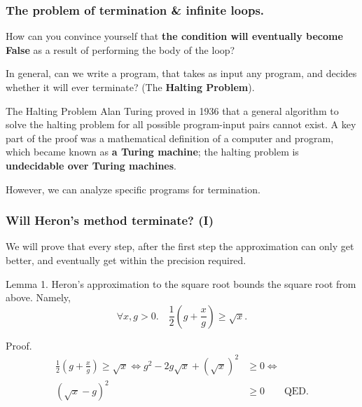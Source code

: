 \documentclass{beamer} %
\newcommand\emc[1]{\textcolor{brightblue}{\textbf{#1}}}
\begin{document}
\begin{frame}
\frametitle{The problem of termination \& infinite loops.}

How can you convince yourself that \emc{the condition will eventually become False} as a result of performing the body of the loop?

\vspace{5mm}
In general, can we write a program, that takes as input any program, and decides whether it will ever terminate? (The \emc{Halting Problem}).

\begin{block}{The Halting Problem}
Alan Turing proved in 1936 that a general algorithm to solve the halting problem for all possible program-input pairs cannot exist. A key part of the proof was a mathematical definition of a computer and program, which became known as \emc{a Turing machine}; the halting problem is \emc{undecidable over Turing machines}. %
\end{block}

However, we can analyze specific programs for termination.

\end{frame}

\begin{frame}
\frametitle{Will Heron's method terminate? (I)}

We will prove that every step, after the first step the approximation can only get better, and eventually get within the precision required.

\vspace{3mm}
Lemma 1. Heron's approximation to the square root bounds the square root from above. Namely, 
\[\forall x,g > 0. \quad \frac{1}{2}(g + \frac{x}{g}) \geq \sqrt{x}.\]

Proof. 
\begin{align}
\frac{1}{2}(g + \frac{x}{g}) \geq \sqrt{x} \Leftrightarrow
g^2 - 2g\sqrt{x}+(\sqrt{x})^2 &\geq 0 \Leftrightarrow \\ 
(\sqrt{x} - g)^2 &\geq 0 \qquad \text{QED}.
\end{align}

\end{frame}
\end{document}
